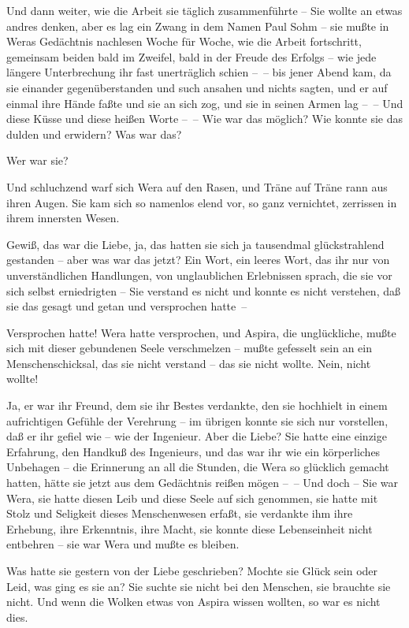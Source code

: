 Und dann weiter, wie die Arbeit sie täglich zusammenführte – Sie
wollte an etwas andres denken, aber es lag ein Zwang in dem Namen
Paul Sohm – sie mußte in Weras Gedächtnis nachlesen Woche für
Woche, wie die Arbeit fortschritt, gemeinsam beiden bald im
Zweifel, bald in der Freude des Erfolgs – wie jede längere
Unterbrechung ihr fast unerträglich schien –~– bis jener Abend kam,
da sie einander gegenüberstanden und such ansahen und nichts
sagten, und er auf einmal ihre Hände faßte und sie an sich zog, und
sie in seinen Armen lag –~– Und diese Küsse und diese heißen Worte
–~– Wie war das möglich? Wie konnte sie das dulden und erwidern?
Was war das?

Wer war sie?

Und schluchzend warf sich Wera auf den Rasen, und Träne auf Träne
rann aus ihren Augen. Sie kam sich so namenlos elend vor, so ganz
vernichtet, zerrissen in ihrem innersten Wesen.

Gewiß, das war die Liebe, ja, das hatten sie sich ja tausendmal
glückstrahlend gestanden – aber was war das jetzt? Ein Wort, ein
leeres Wort, das ihr nur von unverständlichen Handlungen, von
unglaublichen Erlebnissen sprach, die sie vor sich selbst
erniedrigten – Sie verstand es nicht und konnte es nicht verstehen,
daß sie das gesagt und getan und versprochen hatte~–

Versprochen hatte! Wera hatte versprochen, und Aspira, die
unglückliche, mußte sich mit dieser gebundenen Seele verschmelzen –
mußte gefesselt sein an ein Menschenschicksal, das sie nicht
verstand – das sie nicht wollte. Nein, nicht wollte!

Ja, er war ihr Freund, dem sie ihr Bestes verdankte, den sie
hochhielt in einem aufrichtigen Gefühle der Verehrung – im übrigen
konnte sie sich nur vorstellen, daß er ihr gefiel wie – wie der
Ingenieur. Aber die Liebe? Sie hatte eine einzige Erfahrung, den
Handkuß des Ingenieurs, und das war ihr wie ein körperliches
Unbehagen – die Erinnerung an all die Stunden, die Wera so
glücklich gemacht hatten, hätte sie jetzt aus dem Gedächtnis reißen
mögen –~– Und doch – Sie war Wera, sie hatte diesen Leib und diese
Seele auf sich genommen, sie hatte mit Stolz und Seligkeit dieses
Menschenwesen erfaßt, sie verdankte ihm ihre Erhebung, ihre
Erkenntnis, ihre Macht, sie konnte diese Lebenseinheit nicht
entbehren – sie war Wera und mußte es bleiben.

Was hatte sie gestern von der Liebe geschrieben? Mochte sie Glück
sein oder Leid, was ging es sie an? Sie suchte sie nicht bei den
Menschen, sie brauchte sie nicht. Und wenn die Wolken etwas von
Aspira wissen wollten, so war es nicht dies.

